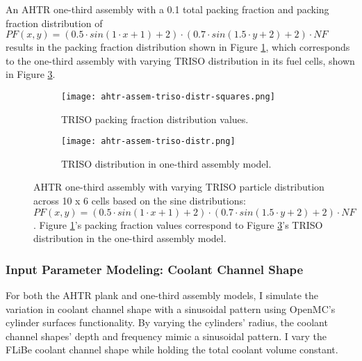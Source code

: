 An \gls{AHTR} one-third assembly with a 0.1 total packing fraction and packing 
fraction distribution of $PF(x, y) = \left(0.5\cdot sin(1\cdot x + 1) + 2\right) \cdot 
\left(0.7\cdot sin(1.5\cdot y + 2) + 2\right) \cdot NF$ results in the packing fraction 
distribution shown in Figure \ref{fig:ahtr-assem-triso-distr-squares}, which 
corresponds to the one-third assembly with varying TRISO distribution in its fuel 
cells, shown in Figure \ref{fig:ahtr-assem-triso-distr}. 
\begin{figure}[htbp]
    \centering
    \begin{subfigure}{0.49\textwidth}
        \texttt{[image: ahtr-assem-triso-distr-squares.png]}
        \caption{TRISO packing fraction distribution values.}
        \label{fig:ahtr-assem-triso-distr-squares} 
    \end{subfigure}
    \begin{subfigure}{0.49\textwidth}
        \texttt{[image: ahtr-assem-triso-distr.png]}
        \raggedleft
        \caption{TRISO distribution in one-third assembly model.}
        \label{fig:ahtr-assem-triso-distr} 
    \end{subfigure}
    \caption{\acrfull{AHTR} one-third assembly with varying \gls{TRISO} particle 
        distribution across 10 x 6 cells based on the sine distributions: $PF(x, y) = 
        \left(0.5\cdot sin(1\cdot x + 1) + 2\right) \cdot 
        \left(0.7\cdot sin(1.5\cdot y + 2) + 2\right) \cdot NF$. 
        Figure \ref{fig:ahtr-assem-triso-distr-squares}'s packing fraction values 
        correspond to Figure \ref{fig:ahtr-assem-triso-distr}'s  TRISO distribution in 
        the one-third assembly model.}
\end{figure}

\subsubsection{Input Parameter Modeling: Coolant Channel Shape}
For both the \gls{AHTR} plank and one-third assembly models, I simulate the variation in 
coolant channel shape with a sinusoidal pattern using OpenMC's cylinder surfaces
functionality.
By varying the cylinders' radius, the coolant channel shapes' depth and frequency 
mimic a sinusoidal pattern.
I vary the \gls{FLiBe} coolant channel shape while holding the total coolant volume 
constant. 

